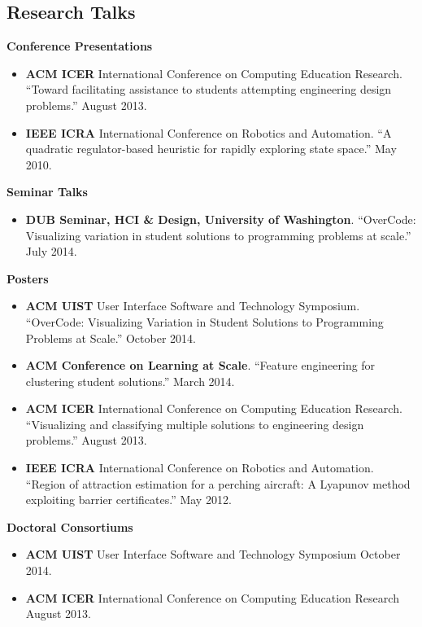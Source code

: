 \documentclass[margin]{res}
\begin{document}
\begin{resume}
\section{Research Talks}
{\bf Conference Presentations}
\begin{itemize}[leftmargin=*]
\item {\bf ACM ICER} International Conference on Computing Education Research. ``Toward facilitating assistance to students attempting engineering design problems.'' \hfill August 2013.
\item {\bf IEEE ICRA} International Conference on Robotics and Automation. ``A quadratic regulator-based heuristic for rapidly exploring state space.'' \hfill May 2010.
\end{itemize}
{\bf Seminar Talks}
\begin{itemize}[leftmargin=*]
\item {\bf DUB Seminar, HCI \& Design, University of Washington}. ``OverCode: Visualizing variation in student solutions to programming problems at scale.'' \hfill July 2014.
\end{itemize}
{\bf Posters}
\begin{itemize}[leftmargin=*]
\item {\bf ACM UIST} User Interface Software and Technology Symposium. ``OverCode: Visualizing Variation in Student Solutions to Programming Problems at Scale.'' \hfill October 2014.
\item {\bf ACM Conference on Learning at Scale}. ``Feature engineering for clustering student solutions.'' \hfill March 2014.
\item {\bf ACM ICER} International Conference on Computing Education Research. ``Visualizing and classifying multiple solutions to engineering design problems.'' \hfill August 2013.
\item {\bf IEEE ICRA} International Conference on Robotics and Automation. ``Region of attraction estimation for a perching aircraft: A Lyapunov method exploiting barrier certificates.'' \hfill May 2012.
\end{itemize}
{\bf Doctoral Consortiums}
\begin{itemize}[leftmargin=*]
\item {\bf ACM UIST} User Interface Software and Technology Symposium \hfill October 2014.
\item {\bf ACM ICER} International Conference on Computing Education Research \hfill August 2013.
\end{itemize}
 

\end{resume}
\end{document}
